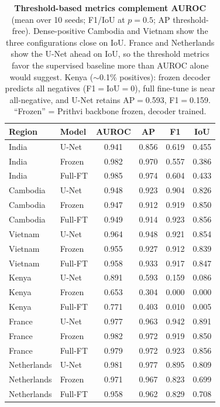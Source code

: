 \documentclass{article}
\newcommand{\tablebodygap}{\vspace{0.45em}}
\begin{document}
\begin{table}[H]\centering\footnotesize
\setlength{\tabcolsep}{5pt}\renewcommand{\arraystretch}{0.95}
\caption{\textbf{Threshold-based metrics complement AUROC} (mean over 10 seeds;
F1/IoU at $p{=}0.5$; AP threshold-free). Dense-positive Cambodia and Vietnam show
the three configurations close on IoU. France and Netherlands show the U-Net
ahead on IoU, so the threshold metrics favor the supervised baseline more
than AUROC alone would suggest. Kenya ($\sim$0.1\% positives): frozen decoder
predicts all negatives (F1$=$IoU$=$0), full fine-tune is near all-negative, and U-Net retains
AP$=$0.593, F1$=$0.159.
``Frozen'' = Prithvi backbone frozen, decoder trained.}
\label{tab:xmetrics}
\tablebodygap
\begin{tabular}{llcccc}
\toprule
Region & Model & AUROC & AP & F1 & IoU \\
\midrule
India       & U-Net   & 0.941 & 0.856 & 0.619 & 0.455 \\
India       & Frozen  & 0.982 & 0.970 & 0.557 & 0.386 \\
India       & Full-FT & 0.985 & 0.974 & 0.604 & 0.433 \\
\midrule
Cambodia    & U-Net   & 0.948 & 0.923 & 0.904 & 0.826 \\
Cambodia    & Frozen  & 0.947 & 0.912 & 0.919 & 0.850 \\
Cambodia    & Full-FT & 0.949 & 0.914 & 0.923 & 0.856 \\
\midrule
Vietnam     & U-Net   & 0.964 & 0.948 & 0.921 & 0.854 \\
Vietnam     & Frozen  & 0.955 & 0.927 & 0.912 & 0.839 \\
Vietnam     & Full-FT & 0.958 & 0.933 & 0.917 & 0.847 \\
\midrule
Kenya       & U-Net   & 0.891 & 0.593 & 0.159 & 0.086 \\
Kenya       & Frozen  & 0.653 & 0.304 & 0.000 & 0.000 \\
Kenya       & Full-FT & 0.771 & 0.403 & 0.010 & 0.005 \\
\midrule
France      & U-Net   & 0.977 & 0.963 & 0.942 & 0.891 \\
France      & Frozen  & 0.982 & 0.972 & 0.919 & 0.850 \\
France      & Full-FT & 0.979 & 0.972 & 0.923 & 0.856 \\
\midrule
Netherlands & U-Net   & 0.981 & 0.977 & 0.895 & 0.809 \\
Netherlands & Frozen  & 0.971 & 0.967 & 0.823 & 0.699 \\
Netherlands & Full-FT & 0.958 & 0.962 & 0.829 & 0.708 \\
\bottomrule
\end{tabular}
\end{table}
\end{document}
